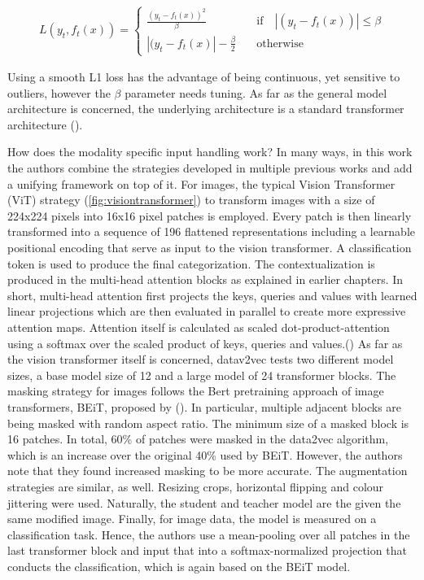\documentclass[
]{krantz}
\begin{document}
\begin{align*}
       L(y_t,f_t(x)) =
    \begin{cases}
        \frac{(y_t - f_t(x))^2}{\beta}    \quad &\text{if} \quad | (y_t - f_t(x)) | \leq \beta \\
                | (y_t - f_t(x) | - \frac{\beta}{2} \quad &\text{otherwise}
    \end{cases}
\end{align*}

Using a smooth L1 loss has the advantage of being continuous, yet sensitive to outliers, however the \(\beta\) parameter needs tuning.
As far as the general model architecture is concerned, the underlying architecture is a standard transformer architecture (\citet{vaswani2017attention}).

How does the modality specific input handling work?
In many ways, in this work the authors combine the strategies developed in multiple previous works and add a unifying framework on top of it. For images, the typical Vision Transformer (ViT) strategy (\ref{fig:visiontransformer}) to transform images with a size of 224x224 pixels into 16x16 pixel patches is employed. Every patch is then linearly transformed into a sequence of 196 flattened representations including a learnable positional encoding that serve as input to the vision transformer. A classification token is used to produce the final categorization. The contextualization is produced in the multi-head attention blocks as explained in earlier chapters.
In short, multi-head attention first projects the keys, queries and values with learned linear projections which are then evaluated in parallel to create more expressive attention maps. Attention itself is calculated as scaled dot-product-attention using a softmax over the scaled product of keys, queries and values.(\citet{vaswani2017attention})
As far as the vision transformer itself is concerned, datav2vec tests two different model sizes, a base model size of 12 and a large model of 24 transformer blocks. The masking strategy for images follows the Bert pretraining approach of image transformers, BEiT, proposed by (\citet{bao2021beit}). In particular, multiple adjacent blocks are being masked with random aspect ratio. The minimum size of a masked block is 16 patches. In total, 60\% of patches were masked in the data2vec algorithm, which is an increase over the original 40\% used by BEiT. However, the authors note that they found increased masking to be more accurate. The augmentation strategies are similar, as well. Resizing crops, horizontal flipping and colour jittering were used. Naturally, the student and teacher model are the given the same modified image. Finally, for image data, the model is measured on a classification task. Hence, the authors use a mean-pooling over all patches in the last transformer block and input that into a softmax-normalized projection that conducts the classification, which is again based on the BEiT model.
\end{document}
